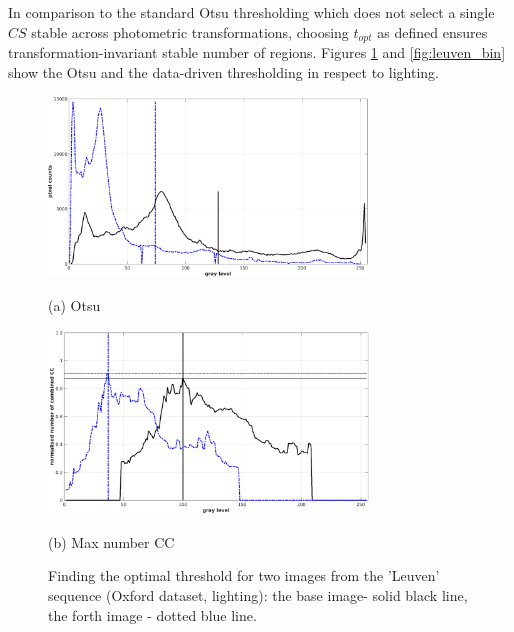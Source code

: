 \documentclass[conference,compsoc]{IEEEtran}
\begin{document}
In comparison to the standard Otsu thresholding which does not select a single $CS$ stable across photometric transformations, choosing $t_{opt}$ as defined ensures transformation-invariant stable number of regions. Figures \ref{fig:binary_hist} and \ref{fig:leuven_bin} show the Otsu and the data-driven thresholding in respect to lighting.
\begin{figure}[htb]

\begin{minipage}[b]{0.99\linewidth}
  \centering
  \centerline{\includegraphics[width=8.5cm]{hist_otsu_leuven_1_4}}
  \centerline{(a) Otsu}\medskip
\end{minipage}
\hfill
\begin{minipage}[b]{0.99\linewidth}
  \centering
  \centerline{\includegraphics[width=8.5cm]{hist_numcc_leuven_1_4}}
\centerline{(b) Max number CC}\medskip
\end{minipage}
\hfill
\caption{Finding the optimal threshold for two images from the 'Leuven' sequence 
(Oxford dataset, lighting): the base image- solid black line, the forth image - dotted blue line.}
\label{fig:binary_hist}
%
\end{figure}
\end{document}
